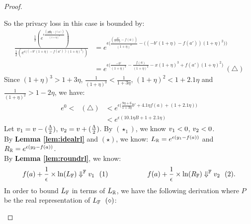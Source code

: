 \documentclass[a4paper,11pt]{article}
\begin{document}
\begin{proof}
\begin{itemize}
		So the privacy loss in this case is bounded by:
		\[
		\begin{array}{ll}
		\frac
		{\frac{1}{2}(e^{\epsilon 
		\frac{(\frac{-b'}{1 + \eta} - f(a))}{(1 + \eta)^2}})}
		{\frac{1}{2}(e^{\epsilon 
		\big((-b'(1 + \eta) - f(a'))(1 + \eta)^2 \big)})}
		& = e^{\epsilon
		\bigg(
		\frac{(\frac{-b'}{1 + \eta} - f(a))}{(1 + \eta)^2}
		-
		\big((-b'(1 + \eta) - f(a'))(1 + \eta)^2 \big)
		\bigg)}\\
		& = e^{\epsilon
		\bigg(
		\frac{-b'}{(1 + \eta)^3} - \frac{f(a)}{(1 + \eta)^2}
		-
		x(1 + \eta)^3 + f(a')(1 + \eta)^2 
		\bigg)} ~ (\triangle)
		\end{array}
		\]
		Since $ (1 + \eta)^3 > 1 + 3\eta$,  $\frac{1}{(1 + \eta)^3} < \frac{1}{1 + 3\eta} $, $(1 + \eta)^2 < 1 + 2.1\eta$ and $\frac{1}{(1 + \eta)^2} > 1 - 2 \eta$, we have:
		\[
		\begin{array}{ll}
		e^0
		<
		~~~ (\triangle) & < e^{\epsilon \big( 
		\frac{9\eta + 6}{1 + 3\eta} b'
		+ 4.1 \eta f(a)
		+ (1 + 2.1\eta) 
		\big)}\\
		& < e^{\epsilon(10.1 \eta B + 1 + 2.1\eta)}
		\end{array}
		\]
		Let $\valv_1 = \valv - (\frac{\Lambda}{2})$,
		$\valv_2 = \valv + (\frac{\Lambda}{2})$.
		By $(\star_1)$, 
		we know $\valv_1 < 0$, $\valv_2 < 0$.
		\\
		By \textbf{Lemma \ref{lem:idealrl}} and $(\star) $, we know: $\rvalL = e^{\epsilon(y_1 - f(a))}$ and 
		$\rvalR = e^{\epsilon(y_2 - f(a))}$.
		\\
		By \textbf{Lemma \ref{lem:roundrl}}, we know:
		$$f(a) + \frac{1}{\epsilon} \times \ln(\fvalL) \fbigstep \valv_1 ~~ (1)
		~~~~~~~~~~~~~~~~~
		f(a) + \frac{1}{\epsilon} \times \ln(\fvalR) \fbigstep \valv_2 ~~ (2).$$
	In order to bound $\fvalL$ in terms of $\rvalL$, we have the following derivation where $P$ be the real representation of $\fvalL ~~ (\diamond)$:
{\scriptsize
\begin{mathpar}
\end{mathpar}}
\end{itemize}
\end{proof}
\end{document}
